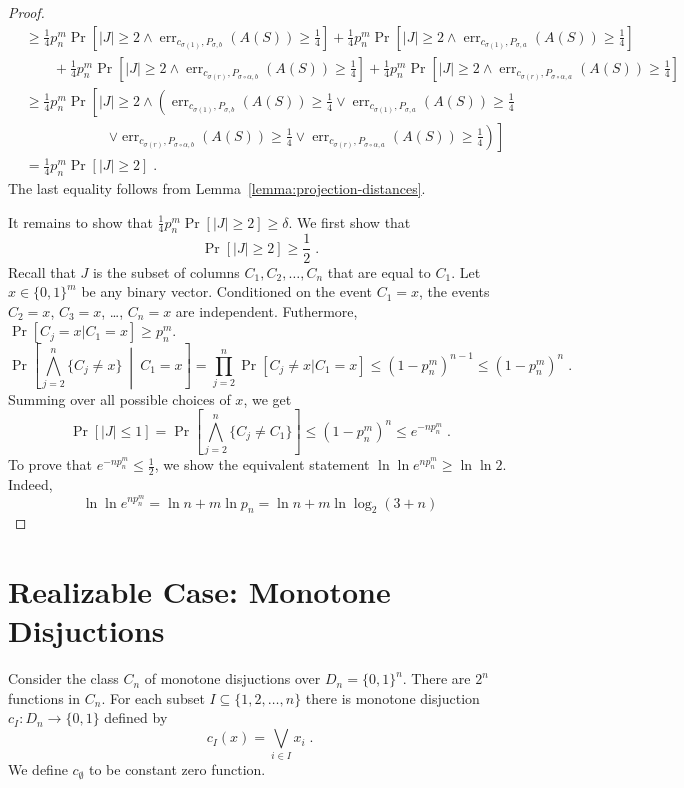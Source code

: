 \documentclass[10pt]{article}
\DeclareMathOperator{\err}{err}
\begin{document}
\begin{proof}
\begin{align*}
& \ge \frac{1}{4} p_n^m \Pr \left[ |J| \ge 2 \wedge \err_{c_{\sigma(1)},P_{\sigma, b}}(A(S)) \ge \frac{1}{4} \right] + \frac{1}{4} p_n^m  \Pr \left[ |J| \ge 2 \wedge \err_{c_{\sigma(1)},P_{\sigma, a}}(A(S)) \ge \frac{1}{4} \right] \\
& \qquad + \frac{1}{4} p_n^m \Pr \left[ |J| \ge 2 \wedge \err_{c_{\sigma(r)},P_{\sigma \circ \alpha, b}}(A(S)) \ge \frac{1}{4} \right] + \frac{1}{4} p_n^m \Pr \left[ |J| \ge 2 \wedge \err_{c_{\sigma(r)},P_{\sigma \circ \alpha, a}}(A(S)) \ge \frac{1}{4} \right] \\
& \ge \frac{1}{4} p_n^m \Pr \left[ |J| \ge 2 \wedge \left( \err_{c_{\sigma(1)},P_{\sigma, b}}(A(S)) \ge \frac{1}{4} \vee \err_{c_{\sigma(1)},P_{\sigma, a}}(A(S)) \ge \frac{1}{4} \right. \right. \\
& \qquad \qquad \qquad \left. \left. \vee \err_{c_{\sigma(r)},P_{\sigma \circ \alpha, b}}(A(S)) \ge \frac{1}{4} \vee \err_{c_{\sigma(r)},P_{\sigma \circ \alpha, a}}(A(S)) \ge \frac{1}{4} \right) \right] \\
& = \frac{1}{4} p_n^m \Pr \left[ |J| \ge 2 \right] \; .
\end{align*}
The last equality follows from Lemma~\ref{lemma:projection-distances}.

It remains to show that $\frac{1}{4} p_n^m \Pr \left[ |J| \ge 2 \right] \ge \delta$.
We first show that
$$
\Pr \left[ |J| \ge 2 \right] \ge \frac{1}{2} \; .
$$
Recall that $J$ is the subset of columns $C_1, C_2, \dots, C_n$ that are equal
to $C_1$. Let $x \in \{0,1\}^m$ be any binary vector. Conditioned on the event
$C_1 = x$, the events $C_2 = x$, $C_3 = x$, \dots, $C_n = x$ are independent.
Futhermore, $\Pr[C_j = x | C_1 = x] \ge p_n^m$.
$$
\Pr \left[ \bigwedge_{j=2}^n \{C_j \neq x\} ~\middle|~ C_1 = x \right] = \prod_{j=2}^n \Pr[C_j \neq x | C_1 = x] \le (1 - p_n^m)^{n-1} \le (1 - p_n^m)^n \; .
$$
Summing over all possible choices of $x$, we get
$$
\Pr[|J| \le 1] = \Pr \left[ \bigwedge_{j=2}^n \{C_j \neq C_1\} \right] \le (1 - p_n^m)^n \le e^{-n p_n^m} \; .
$$
To prove that $e^{-n p_n^m} \le \frac{1}{2}$, we show the equivalent statement $\ln \ln e^{n p_n^m} \ge \ln \ln 2$.
Indeed,
$$
\ln \ln e^{n p_n^m} = \ln n + m \ln p_n = \ln n + m \ln \log_2(3+n)
$$
\end{proof}

\section{Realizable Case: Monotone Disjuctions}

Consider the class $C_n$ of monotone disjuctions over $D_n = \{0,1\}^n$.
There are $2^n$ functions in $C_n$. For each subset $I \subseteq \{1,2,\dots,n\}$
there is monotone disjuction $c_I:D_n \to \{0,1\}$ defined by
$$
c_I(x) = \bigvee_{i \in I} x_i \; .
$$
We define $c_\emptyset$ to be constant zero function.
\end{document}
